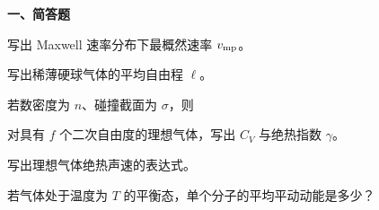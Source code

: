 ﻿


\textbf{一、简答题}
\begin{question}
写出 Maxwell 速率分布下最概然速率 $v_{\rm mp}$。
\begin{solution}

\end{solution}
\end{question}

\begin{question}
写出稀薄硬球气体的平均自由程 $\ell$。
\begin{solution}

若数密度为 $n$、碰撞截面为 $\sigma$，则
\end{solution}
\end{question}

\begin{question}
对具有 $f$ 个二次自由度的理想气体，写出 $C_V$ 与绝热指数 $\gamma$。
\begin{solution}

\end{solution}
\end{question}

\begin{question}
写出理想气体绝热声速的表达式。
\begin{solution}

\end{solution}
\end{question}

\begin{question}
若气体处于温度为 $T$ 的平衡态，单个分子的平均平动动能是多少？
\begin{solution}

\end{solution}
\end{question}

